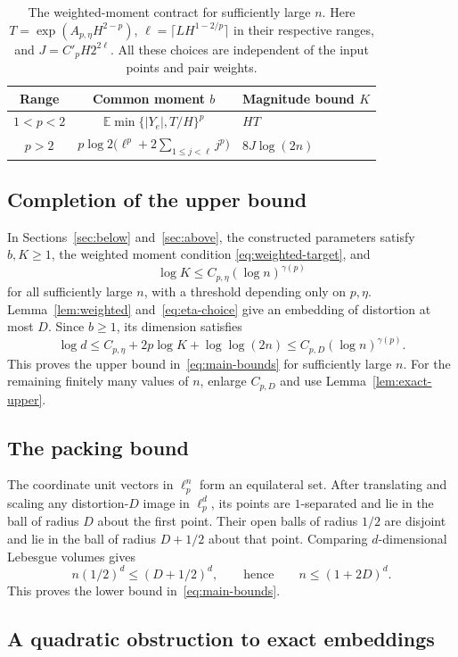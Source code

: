 \documentclass[11pt]{article}
\newcommand{\E}{\mathbb E}
\theoremstyle{remark}
\numberwithin{equation}{section}
\begin{document}
\begin{table}[ht]
\centering
\renewcommand{\arraystretch}{1.4}
\begin{tabular}{ccl}
Range & Common moment $b$ & Magnitude bound $K$ \\
\hline
$1<p<2$ & $\E\min\{|Y_e|,T/H\}^p$ & $HT$ \\
$p>2$ & $p\log2\bigl(\ell^p+2\sum_{1\le j<\ell}j^p\bigr)$
       & $8J\log(2n)$
\end{tabular}
\caption{The weighted-moment contract for sufficiently large $n$.
Here $T=\exp(A_{p,\eta}H^{2-p})$, $\ell=\lceil LH^{1-2/p}\rceil$
in their respective ranges, and $J=C'_pH2^{2\ell}$.
All these choices are independent of the input points and pair weights.}
\label{tab:moment-contract}
\end{table}

\subsection{Completion of the upper bound}

In Sections~\ref{sec:below} and~\ref{sec:above}, the constructed
parameters satisfy $b,K\ge1$, the weighted moment condition
\eqref{eq:weighted-target}, and
\[
 \log K\le C_{p,\eta}(\log n)^{\gamma(p)}
\]
for all sufficiently large $n$, with a threshold depending only on
$p,\eta$. Lemma~\ref{lem:weighted} and~\eqref{eq:eta-choice} give
an embedding of distortion at most $D$. Since $b\ge1$, its dimension
satisfies
\[
 \log d\le C_{p,\eta}+2p\log K+\log\log(2n)
 \le C_{p,D}(\log n)^{\gamma(p)}.
\]
This proves the upper bound in~\eqref{eq:main-bounds} for sufficiently
large $n$. For the remaining finitely many values of $n$, enlarge
$C_{p,D}$ and use Lemma~\ref{lem:exact-upper}.

\subsection{The packing bound}

The coordinate unit vectors in $\ell_p^n$ form an equilateral set.
After translating and scaling any distortion-$D$ image in $\ell_p^d$,
its points are $1$-separated and lie in the ball of radius $D$ about
the first point. Their open balls of radius $1/2$ are disjoint and
lie in the ball of radius $D+1/2$ about that point. Comparing
$d$-dimensional Lebesgue volumes gives
\[
 n(1/2)^d\le(D+1/2)^d,
 \qquad\text{hence}\qquad n\le(1+2D)^d.
\]
This proves the lower bound in~\eqref{eq:main-bounds}.

\subsection{A quadratic obstruction to exact embeddings}
\end{document}
